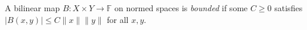 
A bilinear map $B:X\times Y\to\mathbb F$ on normed spaces is \emph{bounded} if some $C\ge0$ satisfies $|B(x,y)|\le C\|x\|\|y\|$ for all $x,y$.
